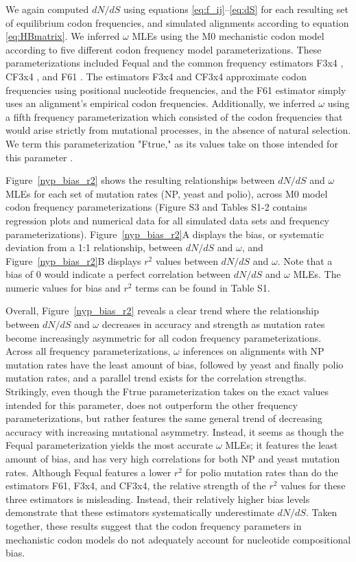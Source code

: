 \documentclass{pnastwo}
\begin{document}
\begin{article}
We again computed $dN/dS$ using equations \eqref{eq:f_ij}--\eqref{eq:dS} for each resulting set of equilibrium codon frequencies, and simulated alignments according to equation \eqref{eq:HBmatrix}. We inferred $\omega$ MLEs using the M0 mechanistic codon model  according to five different codon frequency model parameterizations. These parameterizations included Fequal \cite{Yang2006} and the common frequency estimators F3x4 \cite{MuseGaut1994}, CF3x4 \cite{Pond2010}, and F61 \cite{GoldmanYang1994}. The estimators F3x4 and CF3x4 approximate codon frequencies using positional nucleotide frequencies, and the F61 estimator simply uses an alignment's empirical codon frequencies. Additionally, we inferred $\omega$ using a fifth frequency parameterization which consisted of the codon frequencies that would arise strictly from mutational processes, in the absence of natural selection. We term this parameterization "Ftrue," as its values take on those intended for this parameter \cite{GoldmanYang1994,MuseGaut1994,YN00,Yang2006}.


Figure~\ref{nyp_bias_r2} shows the resulting relationships between $dN/dS$ and $\omega$ MLEs for each set of mutation rates (NP, yeast and polio), across M0 model codon frequency parameterizations (Figure S3 and Tables S1-2 contains regression plots and numerical data for all simulated data sets and frequency parameterizations). Figure~\ref{nyp_bias_r2}A displays the bias, or systematic deviation from a 1:1 relationship, between $dN/dS$ and $\omega$, and Figure~\ref{nyp_bias_r2}B displays $r^2$ values between $dN/dS$ and $\omega$. Note that a bias of 0 would indicate a perfect correlation between $dN/dS$ and $\omega$ MLEs. The numeric values for bias and $r^2$ terms can be found in Table S1.

Overall, Figure~\ref{nyp_bias_r2} reveals a clear trend where the relationship between $dN/dS$ and $\omega$ decreases in accuracy and strength as mutation rates become increasingly asymmetric for all codon frequency parameterizations. Across all frequency parameterizations, $\omega$ inferences on alignments with NP mutation rates have the least amount of bias, followed by yeast and finally polio mutation rates, and a parallel trend exists for the correlation strengths. Strikingly, even though the Ftrue parameterization takes on the exact values intended for this parameter, does not outperform the other frequency parameterizations, but rather features the same general trend of decreasing accuracy with increasing mutational asymmetry. Instead, it seems as though the Fequal parameterization yields the most accurate $\omega$ MLEs; it features the least amount of bias, and has very high correlations for both NP and yeast mutation rates. Although Fequal features a lower $r^2$ for polio mutation rates than do the estimators F61, F3x4, and CF3x4, the relative strength of the $r^2 $ values for these three estimators is misleading. Instead, their relatively higher bias levels demonstrate that these estimators systematically underestimate $dN/dS$. Taken together, these results suggest that the codon frequency parameters in mechanistic codon models do not adequately account for nucleotide compositional bias. 


\end{article}
\end{document}
